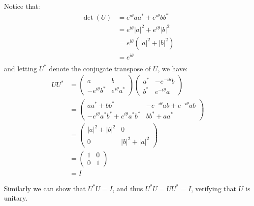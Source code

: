 \documentclass{article}
\begin{document}
Notice that:
\begin{align*}
\det(U)      &= e^{i\theta}a a^{*} + e^{i\theta}b b^{*}\\
&= e^{i\theta}|a|^2 + e^{i\theta}|b|^2\\
&= e^{i\theta}(|a|^2 + |b|^2)\\
&= e^{i\theta}\\
\end{align*}
and letting $U^*$ denote the conjugate transpose of $U$, we have:
\begin{align*}
U U^* &=
\begin{pmatrix}
a & b\\
-e^{i\theta}b^{*} & e^{i\theta}a^{*}
\end{pmatrix}
\begin{pmatrix}
a^* & -e^{-i\theta}b\\
b^* & e^{-i\theta}a
\end{pmatrix}\\
&= \begin{pmatrix}
   aa^* + bb^* &
   -e^{-i\theta}ab + e^{-i\theta}ab\\
   -e^{i\theta}a^{*}b^{*} + e^{i\theta}a^{*}b^{*} &
   bb^* + aa^*
   \end{pmatrix}\\
&= \begin{pmatrix}
   |a|^2 + |b|^2 & 0\\
   0             & |b|^2 + |a|^2
   \end{pmatrix}\\
&= \begin{pmatrix}
   1 & 0\\
   0 & 1
   \end{pmatrix}\\
&= I
\end{align*}

Similarly we can show that $U^{*}U = I$, and thus $U^{*}U = UU^{*} = I$, verifying that $U$ is unitary.
\end{document}
